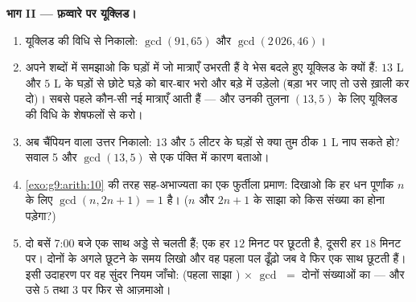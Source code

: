 \begin{problem}
\medskip
\noindent\textbf{भाग II --- फ़व्वारे पर यूक्लिड।}
\begin{enumerate}[resume]
  \item यूक्लिड की विधि से निकालो: $\gcd(91, 65)$ और
        $\gcd(2\,026, 46)$।
  \item अपने शब्दों में समझाओ कि घड़ों में जो मात्राएँ उभरती हैं वे
        भेस बदले हुए यूक्लिड के  क्यों हैं: $13$ L और $5$ L के
        घड़ों से छोटे घड़े को बार-बार भरो और बड़े में उड़ेलो (बड़ा भर
        जाए तो उसे ख़ाली कर दो)। सबसे पहले कौन-सी नई मात्राएँ आती
        हैं --- और उनकी तुलना $(13, 5)$ के लिए यूक्लिड की विधि के
        शेषफलों से करो।
  \item अब चैंपियन वाला उत्तर निकालो: $13$ और $5$ लीटर के घड़ों से
        क्या तुम ठीक $1$ L नाप सकते हो? सवाल 5 और $\gcd(13, 5)$ से
        एक पंक्ति में कारण बताओ।
  \item \cref{exo:g9:arith:10} की तरह सह-अभाज्यता का एक फुर्तीला
        प्रमाण: दिखाओ कि हर धन पूर्णांक $n$ के लिए
        $\gcd(n, 2n + 1) = 1$ है। ($n$ और $2n + 1$ के साझा  को
        किस संख्या का  होना पड़ेगा?)
  \item दो बसें 7:00 बजे एक साथ अड्डे से चलती हैं; एक हर $12$ मिनट
        पर छूटती है, दूसरी हर $18$ मिनट पर। दोनों के अगले छूटने के
        समय लिखो और वह पहला पल ढूँढ़ो जब वे फिर एक साथ छूटती हैं।
        इसी उदाहरण पर वह सुंदर नियम जाँचो: (पहला साझा ) $\times$
        $\gcd$ $=$ दोनों संख्याओं का  --- और उसे $5$ तथा $3$
        पर फिर से आज़माओ।
\end{enumerate}


\end{problem}
